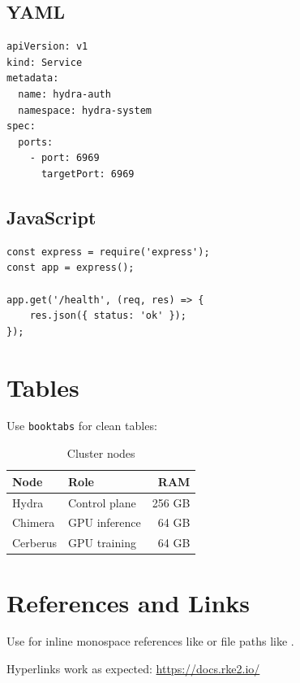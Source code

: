 \documentclass[11pt,a4paper]{article}
\begin{document}
\subsection{YAML}

\begin{lstlisting}[style=yaml]
apiVersion: v1
kind: Service
metadata:
  name: hydra-auth
  namespace: hydra-system
spec:
  ports:
    - port: 6969
      targetPort: 6969
\end{lstlisting}

\subsection{JavaScript}

\begin{lstlisting}[style=js]
const express = require('express');
const app = express();

app.get('/health', (req, res) => {
    res.json({ status: 'ok' });
});
\end{lstlisting}

\section{Tables}

Use \texttt{booktabs} for clean tables:

\begin{table}[H]
\centering
\begin{tabular}{@{}llr@{}}
\toprule
\textbf{Node} & \textbf{Role} & \textbf{RAM} \\
\midrule
Hydra    & Control plane   & 256 GB \\
Chimera  & GPU inference   & 64 GB  \\
Cerberus & GPU training    & 64 GB  \\
\bottomrule
\end{tabular}
\caption{Cluster nodes}
\end{table}

\section{References and Links}

Use  for inline monospace references
like  or file paths like .

Hyperlinks work as expected: \url{https://docs.rke2.io/}
\end{document}
